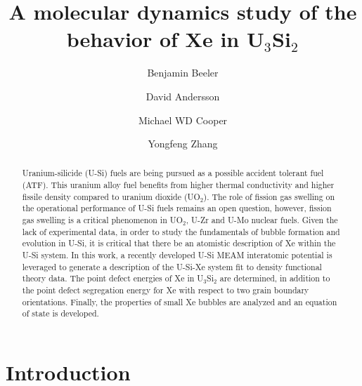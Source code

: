 \documentclass[review]{elsarticle}
\begin{document}
\begin{frontmatter}
\title{A molecular dynamics study of the behavior of Xe in U$_{3}$Si$_{2}$}

\author[inl]{Benjamin Beeler}
\author[lanl]{David Andersson}
\author[lanl]{Michael WD Cooper}
\author[inl]{Yongfeng Zhang}
\address[inl]{Idaho National Laboratory, Idaho Falls, ID 83415}
\address[lanl]{Los Alamos National Laboratory, Los Alamos, NM 87545}



\begin{abstract}

Uranium-silicide (U-Si) fuels are being pursued as a possible accident tolerant fuel (ATF). This uranium alloy fuel benefits from higher thermal conductivity and higher fissile density compared to uranium dioxide (UO$_{2}$). The role of fission gas swelling on the operational performance of U-Si fuels remains an open question, however, fission gas swelling is a critical phenomenon in UO$_{2}$, U-Zr and U-Mo nuclear fuels. Given the lack of experimental data, in order to study the fundamentals of bubble formation and evolution in U-Si, it is critical that there be an atomistic description of Xe within the U-Si system. In this work, a recently developed U-Si MEAM interatomic potential is leveraged to generate a description of the U-Si-Xe system fit to density functional theory data. The point defect energies of Xe in U$_{3}$Si$_{2}$ are determined, in addition to the point defect segregation energy for Xe with respect to two grain boundary orientations. Finally, the properties of small Xe bubbles are analyzed and an equation of state is developed. 

\end{abstract}
\end{frontmatter}

\section{Introduction}
\end{document}
